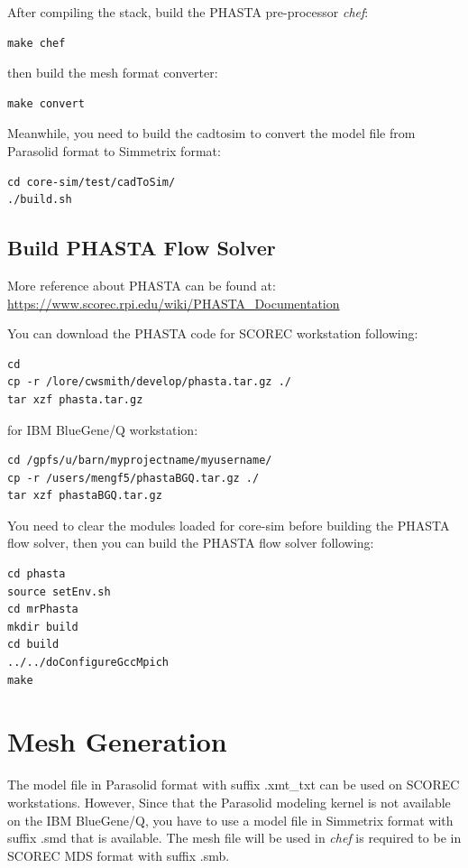 \documentclass{article}
\begin{document}
After compiling the stack, build the PHASTA pre-processor \textit{chef}:
\begin{lstlisting}
make chef
\end{lstlisting}

then build the mesh format converter:
\begin{lstlisting}
make convert 
\end{lstlisting}

Meanwhile, you need to build the cadtosim to convert the model file from Parasolid format to Simmetrix format:
\begin{lstlisting}
cd core-sim/test/cadToSim/ 
./build.sh 
\end{lstlisting}

\subsection{Build PHASTA Flow Solver}

More reference about PHASTA can be found at:\\
\url{https://www.scorec.rpi.edu/wiki/PHASTA_Documentation} 

You can download the PHASTA code for SCOREC workstation following:
\begin{lstlisting}
cd 
cp -r /lore/cwsmith/develop/phasta.tar.gz ./
tar xzf phasta.tar.gz
\end{lstlisting}
for IBM BlueGene/Q workstation:
\begin{lstlisting}
cd /gpfs/u/barn/myprojectname/myusername/
cp -r /users/mengf5/phastaBGQ.tar.gz ./
tar xzf phastaBGQ.tar.gz
\end{lstlisting}
You need to clear the modules loaded for core-sim before building the PHASTA flow solver, then you can build the PHASTA flow solver following:
\begin{lstlisting}
cd phasta
source setEnv.sh
cd mrPhasta
mkdir build
cd build
../../doConfigureGccMpich
make
\end{lstlisting}


\section{Mesh Generation}
\label{ch:3}
The model file in Parasolid format with suffix .xmt\_txt can be used on SCOREC workstations. However, Since that the Parasolid modeling kernel is not available on the IBM BlueGene/Q, you have to use a model file in Simmetrix format with suffix .smd that is available. The mesh file will be used in \textit{chef} is required to be in SCOREC MDS format with suffix .smb.
\end{document}

